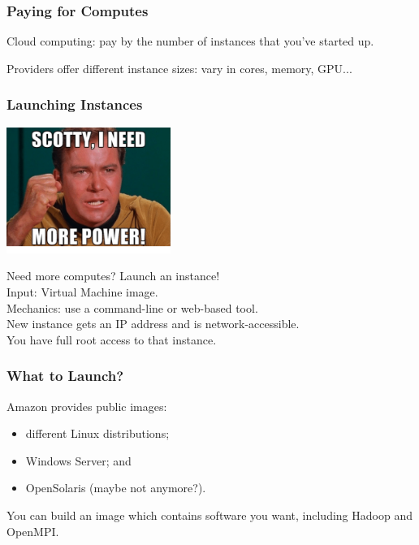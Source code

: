 \begin{frame}
  \frametitle{Paying for Computes}

  
Cloud computing: pay by the number of
instances that you've started up.


Providers offer different instance sizes: vary in cores, memory, GPU...

  
\end{frame}

\begin{frame}
  \frametitle{Launching Instances}
  
  \begin{center}
	\includegraphics[width=0.4\textwidth]{images/kirk.png}
\end{center}

  
Need more computes? Launch an instance!\\[1em]

Input: Virtual Machine image.\\[1em]

Mechanics: use a command-line or web-based tool.\\[1em]

New instance gets an IP address and is network-accessible. \\
You have full root access to that instance.
  
\end{frame}

\begin{frame}
  \frametitle{What to Launch?}

  
Amazon provides public images:
\begin{itemize}
\item different Linux distributions;
\item Windows Server; and
\item OpenSolaris (maybe not anymore?). 
\end{itemize}

You can build an image which contains software you
want, including Hadoop and OpenMPI.
  
\end{frame}

